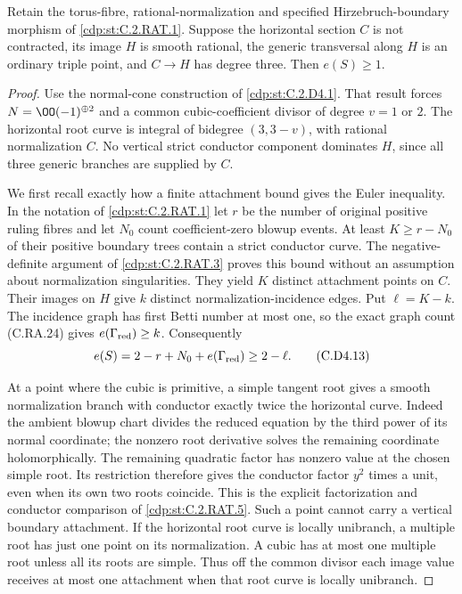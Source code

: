 
\begin{proposition}\label{cdp:st:C.2.D4.3}
Retain the torus-fibre, rational-normalization and specified
Hirzebruch-boundary morphism of \ref{cdp:st:C.2.RAT.1}. Suppose the horizontal
section $C$ is not contracted, its image $H$ is smooth rational,
the generic transversal along $H$ is an ordinary triple point,
and $C\to H$ has degree three. Then $e(S)\ge1$.
\end{proposition}
\begin{proof}
Use the normal-cone construction of \ref{cdp:st:C.2.D4.1}. That result forces
$N=\OO(-1)^{\oplus2}$ and a common cubic-coefficient divisor
of degree $v=1$ or $2$. The horizontal root curve is integral
of bidegree $(3,3-v)$, with rational normalization $C$.
No vertical strict conductor component dominates $H$, since
all three generic branches are supplied by $C$.

We first recall exactly how a finite attachment bound gives
the Euler inequality. In the notation of \ref{cdp:st:C.2.RAT.1} let $r$
be the number of original positive ruling fibres and let
$N_0$ count coefficient-zero blowup events. At least
$K\ge r-N_0$ of their positive boundary trees contain a
strict conductor curve. The negative-definite argument of
\ref{cdp:st:C.2.RAT.3} proves this bound without an assumption about
normalization singularities. They yield $K$ distinct
attachment points on $C$. Their images on $H$ give $k$
distinct normalization-incidence edges. Put $\ell=K-k$.
The incidence graph has first Betti number at most one,
so the exact graph count (C.RA.24) gives
$e(\Gamma_{\rm red})\ge k$. Consequently
\[
             e(S)=2-r+N_0+e(\Gamma_{\rm red})\ge2-\ell.
\tag{C.D4.13}\label{cdp:eq:C.D4.13}
\]

At a point where the cubic is primitive, a simple tangent
root gives a smooth normalization branch with conductor
exactly twice the horizontal curve. Indeed the ambient
blowup chart divides the reduced equation by the third
power of its normal coordinate; the nonzero root derivative
solves the remaining coordinate holomorphically. The
remaining quadratic factor has nonzero value at the chosen
simple root. Its restriction therefore gives the conductor
factor $y^2$ times a unit, even when its own two roots coincide. This is the explicit
factorization and conductor comparison of \ref{cdp:st:C.2.RAT.5}.
Such a point cannot carry a vertical boundary attachment.
If the horizontal root curve is locally unibranch, a
multiple root has just one point on its normalization.
A cubic has at most one multiple root unless all its roots
are simple. Thus off the common divisor each image value
receives at most one attachment when that root curve is
locally unibranch.


\end{proof}
